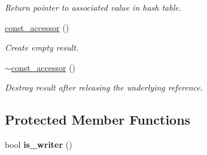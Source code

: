 \begin{DoxyCompactItemize}
\begin{DoxyCompactList}\small\item\em Return pointer to associated value in hash table. \end{DoxyCompactList}\item 
\hypertarget{classtbb_1_1interface5_1_1concurrent__hash__map_1_1const__accessor_a3718abe0b188a3cf45d4d288b43d626c}{}\hyperlink{classtbb_1_1interface5_1_1concurrent__hash__map_1_1const__accessor_a3718abe0b188a3cf45d4d288b43d626c}{const\+\_\+accessor} ()\label{classtbb_1_1interface5_1_1concurrent__hash__map_1_1const__accessor_a3718abe0b188a3cf45d4d288b43d626c}

\begin{DoxyCompactList}\small\item\em Create empty result. \end{DoxyCompactList}\item 
\hypertarget{classtbb_1_1interface5_1_1concurrent__hash__map_1_1const__accessor_a0715037d2e5d03bf1a9b3477e5e6f561}{}\hyperlink{classtbb_1_1interface5_1_1concurrent__hash__map_1_1const__accessor_a0715037d2e5d03bf1a9b3477e5e6f561}{$\sim$const\+\_\+accessor} ()\label{classtbb_1_1interface5_1_1concurrent__hash__map_1_1const__accessor_a0715037d2e5d03bf1a9b3477e5e6f561}

\begin{DoxyCompactList}\small\item\em Destroy result after releasing the underlying reference. \end{DoxyCompactList}\end{DoxyCompactItemize}
\subsection*{Protected Member Functions}
\begin{DoxyCompactItemize}
\item 
\hypertarget{classtbb_1_1interface5_1_1concurrent__hash__map_1_1const__accessor_a22a2d474dbed2eb9a4e91cc8d46d407e}{}bool {\bfseries is\+\_\+writer} ()\label{classtbb_1_1interface5_1_1concurrent__hash__map_1_1const__accessor_a22a2d474dbed2eb9a4e91cc8d46d407e}

\end{DoxyCompactItemize}
